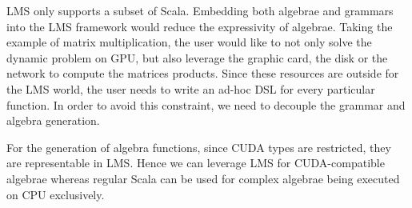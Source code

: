 LMS only supports a subset of Scala. Embedding both algebrae and grammars into the LMS framework would reduce the expressivity of algebrae. Taking the example of matrix multiplication, the user would like to not only solve the dynamic problem on GPU, but also leverage the graphic card, the disk or the network to compute the matrices products. Since these resources are outside for the LMS world, the user needs to write an ad-hoc DSL for every particular function. In order to avoid this constraint, we need to decouple the grammar and algebra generation.

For the generation of algebra functions, since CUDA types are restricted, they are representable in LMS. Hence we can leverage LMS for CUDA-compatible algebrae whereas regular Scala can be used for complex algebrae being executed on CPU exclusively.


